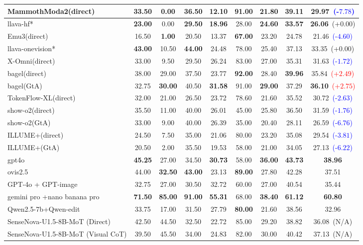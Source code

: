 \documentclass{article}
\providecommand{\rowcolor}[1]{}
\theoremstyle{plain}
\theoremstyle{definition}
\theoremstyle{remark}
\begin{document}
\begin{table}[!t]
{\begin{tabular}{@{}lcccccccc@{}}
MammothModa2(direct) & 33.50 & 0.00 & 36.50 & 12.10 & \textbf{91.00} & 21.80 & 39.11 & 29.97~\textcolor{blue}{(-$7.78$)} \\
\midrule
\rowcolor{gray!12}
llava-hf* & \textbf{23.00} & 0.00 & \textbf{29.50} & \textbf{18.96} & 28.00 & \textbf{24.60} & \textbf{33.57} & \textbf{26.06}~(+$0.00$) \\
Emu3(direct) & 16.50 & \textbf{1.00} & 20.50 & 13.37 & \textbf{67.00} & 23.20 & 24.78 & 21.46~\textcolor{blue}{(-$4.60$)} \\
\midrule
\rowcolor{gray!12}
llava-onevision* & \textbf{43.00} & 10.50 & \textbf{44.00} & 24.48 & 78.00 & 25.40 & 37.13 & 33.35~(+$0.00$) \\
X-Omni(direct) & 33.00 & 9.50 & 29.50 & 26.24 & 83.00 & 27.00 & 35.31 & 31.63~\textcolor{blue}{(-$1.72$)} \\
bagel(direct) & 38.00 & 29.00 & 37.50 & 23.77 & \textbf{92.00} & 28.40 & \textbf{39.96} & 35.84~\textcolor{red}{(+$2.49$)} \\
bagel(GtA) & 32.75 & \textbf{30.00} & 40.50 & \textbf{31.58} & 91.00 & \textbf{29.00} & 37.29 & \textbf{36.10}~\textcolor{red}{(+$2.75$)} \\
TokenFlow-XL(direct) & 32.00 & 21.00 & 26.50 & 23.72 & 78.60 & 21.60 & 35.52 & 30.72~\textcolor{blue}{(-$2.63$)} \\
show-o2(direct) & 35.50 & 11.00 & 40.00 & 26.01 & 45.00 & 25.80 & 36.50 & 31.59~\textcolor{blue}{(-$1.76$)} \\
show-o2(GtA) & 33.00 & 9.00 & 40.00 & 26.39 & 35.00 & 20.40 & 28.11 & 26.59~\textcolor{blue}{(-$6.76$)} \\
ILLUME+(direct) & 24.50 & 7.50 & 35.00 & 21.06 & 80.00 & 23.20 & 35.08 & 29.54~\textcolor{blue}{(-$3.81$)} \\
ILLUME+(GtA) & 20.50 & 2.00 & 35.50 & 19.53 & 58.00 & 21.00 & 34.05 & 27.13~\textcolor{blue}{(-$6.22$)} \\
\midrule
\rowcolor{orange!8}
gpt4o & \textbf{45.25} & 27.00 & 34.50 & \textbf{30.73} & 58.00 & \textbf{36.00} & \textbf{43.73} & \textbf{38.96} \\
ovis2.5 & 44.00 & \textbf{32.50} & \textbf{43.00} & 23.13 & \textbf{89.00} & 27.80 & 42.28 & 37.51 \\
\midrule
GPT-4o + GPT-image & 32.75 & 27.00 & 30.50 & 32.72 & 60.00 & 27.00 & 40.54 & 35.44 \\
gemini pro +nano banana pro & \textbf{71.50} & \textbf{85.00} & \textbf{91.00} & \textbf{55.31} & 68.00 & \textbf{38.40} & \textbf{61.12} & \textbf{60.80} \\
Qwen2.5-7b+Qwen-edit & 33.75 & 17.00 & 31.50 & 27.79 & \textbf{80.00} & 21.60 & 38.56 & 32.96 \\
\midrule
SenseNova-U1.5-8B-MoT (Direct) & 42.50 & 44.50 & 32.50 & 22.72 & 85.00 & 29.20 & 38.82 & 36.08~(N/A) \\
SenseNova-U1.5-8B-MoT (Visual CoT) & 39.50 & 45.50 & 34.00 & 24.83 & 82.00 & 30.00 & 40.42 & 37.13~(N/A) \\
\bottomrule
\end{tabular}%
}


\end{table}
\end{document}
